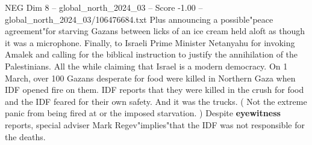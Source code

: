 \begin{textsample}{NEG Dim 8 – global\_north\_2024\_03 – Score -1.00 – global\_north\_2024\_03/106476684.txt}
Plus announcing a possible"peace agreement"for starving Gazans between licks of an ice cream held aloft as though it was a microphone.
Finally, to Israeli Prime Minister Netanyahu for invoking Amalek and calling for the biblical instruction to justify the annihilation of the Palestinians.
All the while claiming that Israel is a modern democracy.
On 1 March, over 100 Gazans desperate for food were killed in Northern Gaza when IDF opened fire on them.
IDF reports that they were killed in the crush for food and the IDF feared for their own safety.
And it was the trucks. ( Not the extreme panic from being fired at or the imposed starvation. ) Despite \textbf{eyewitness} reports, special adviser Mark Regev"implies"that the IDF was not responsible for the deaths.

\end{textsample}

